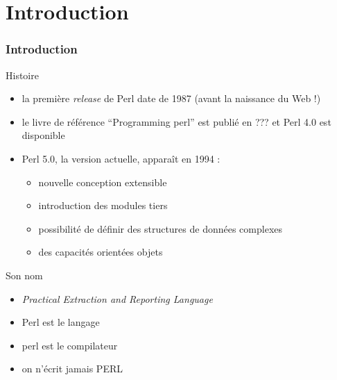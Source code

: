 \section{Introduction}

\begin{frame}
  \frametitle{Introduction}

  \begin{block}{Histoire}
    \begin{itemize}
      \item la première \textit{release} de Perl date de 1987 (avant la
        naissance du Web !)
      \item le livre de référence ``Programming perl'' est publié en ??? et
        Perl 4.0 est disponible
      \item Perl 5.0, la version actuelle, apparaît en 1994 :
        \begin{itemize}
        \item nouvelle conception extensible
        \item introduction des modules tiers
	\item possibilité de définir des structures de données complexes
        \item des capacités orientées objets
        \end{itemize}
    \end{itemize}
  \end{block}

  \begin{exampleblock}{Son nom}
    \begin{itemize}
      \item \textit{Practical Extraction and Reporting Language}
      \item Perl est le langage
      \item perl est le compilateur
      \item on n'écrit jamais PERL
    \end{itemize}
  \end{exampleblock}

\end{frame}


